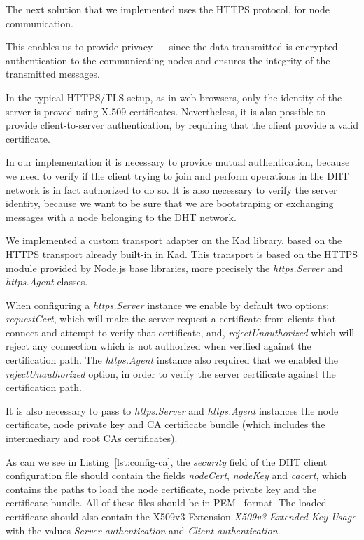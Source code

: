 The next solution that we implemented uses the HTTPS protocol, for node communication.

This enables us to provide privacy — since the data transmitted is encrypted — authentication to the communicating nodes and ensures the integrity of the transmitted messages.

In the typical HTTPS/TLS setup, as in web browsers, only the identity of the server is proved using X.509 certificates.
Nevertheless, it is also possible to provide client-to-server authentication, by requiring that the client provide a valid certificate.

In our implementation it is necessary to provide mutual authentication, because we need to verify if the client trying to join and perform operations in the DHT network is in fact authorized to do so.
It is also necessary to verify the server identity, because we want to be sure that we are bootstraping or exchanging messages with a node belonging to the DHT network.

We implemented a custom transport adapter on the Kad library, based on the HTTPS transport already built-in in Kad.
This transport is based on the HTTPS module provided by Node.js base libraries, more precisely the \textit{https.Server} and \textit{https.Agent} classes.

When configuring a \textit{https.Server} instance we enable by default two options: \textit{requestCert}, which will make the server request a certificate from clients that connect and attempt to verify that certificate, and, \textit{rejectUnauthorized} which will reject any connection which is not authorized when verified against the certification path.
The \textit{https.Agent} instance also required that we enabled the \textit{rejectUnauthorized} option, in order to verify the server certificate against the certification path.

It is also necessary to pass to \textit{https.Server} and \textit{https.Agent} instances the node certificate, node private key and CA certificate bundle (which includes the intermediary and root CAs certificates).

As can we see in Listing~\ref{lst:config-ca}, the \textit{security} field of the DHT client configuration file should contain the fields \textit{nodeCert}, \textit{nodeKey} and \textit{cacert}, which contains the paths to load the node certificate, node private key and the certificate bundle.
All of these files should be in \ac{PEM}~\cite{rfc1421} format.
The loaded certificate should also contain the X509v3 Extension \textit{X509v3 Extended Key Usage} with the values \textit{Server authentication} and \textit{Client authentication}.

